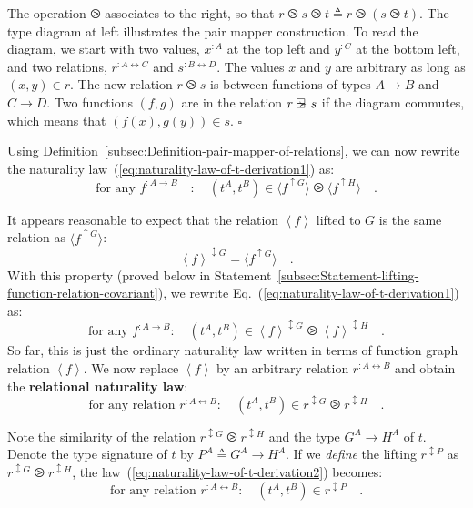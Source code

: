 \noindent The operation $\ogreaterthan$ associates to the right,
so that $r\ogreaterthan s\ogreaterthan t\triangleq r\ogreaterthan\left(s\ogreaterthan t\right)$.
The type diagram at left illustrates the pair mapper construction.
To read the diagram, we start with two values, $x^{:A}$ at the top
left and $y^{:C}$ at the bottom left, and two relations, $r^{:A\leftrightarrow C}$
and $s^{:B\leftrightarrow D}$. The values $x$ and $y$ are arbitrary
as long as $(x,y)\in r$. The new relation $r\ogreaterthan s$ is
between functions of types $A\rightarrow B$ and $C\rightarrow D$.
Two functions $\left(f,g\right)$ are in the relation $r\varogreaterthan s$
if the diagram commutes, which means that $(f(x),g(y))\in s$. $\square$

Using Definition~\ref{subsec:Definition-pair-mapper-of-relations},
we can now rewrite the naturality law~(\ref{eq:naturality-law-of-t-derivation1})
as:
\[
\text{for any }f^{:A\rightarrow B}\quad:\quad(t^{A},t^{B})\in\langle f^{\uparrow G}\rangle\ogreaterthan\langle f^{\uparrow H}\rangle\quad.
\]

It appears reasonable to expect that the relation $\left<f\right>$
lifted to $G$ is the same relation as $\langle f^{\uparrow G}\rangle$:
\[
\left<f\right>^{\updownarrow G}=\langle f^{\uparrow G}\rangle\quad.
\]
With this property (proved below in Statement~\ref{subsec:Statement-lifting-function-relation-covariant}),
we rewrite Eq.~(\ref{eq:naturality-law-of-t-derivation1}) as:
\[
\text{for any }f^{:A\rightarrow B}:\quad(t^{A},t^{B})\in\left<f\right>^{\updownarrow G}\ogreaterthan\left<f\right>^{\updownarrow H}\quad.
\]
So far, this is just the ordinary naturality law written in terms
of function graph relation $\left<f\right>$. We now replace $\left<f\right>$
by an arbitrary relation $r^{:A\leftrightarrow B}$ and obtain the
\textbf{relational naturality law}:
\begin{equation}
\text{for any relation }r^{:A\leftrightarrow B}:\quad(t^{A},t^{B})\in r^{\updownarrow G}\ogreaterthan r^{\updownarrow H}\quad.\label{eq:naturality-law-of-t-derivation2}
\end{equation}

Note the similarity of the relation $r^{\updownarrow G}\ogreaterthan r^{\updownarrow H}$
and the type $G^{A}\rightarrow H^{A}$ of $t$. Denote the type signature
of $t$ by $P^{A}\triangleq G^{A}\rightarrow H^{A}$. If we \emph{define}
the lifting $r^{\updownarrow P}$ as $r^{\updownarrow G}\ogreaterthan r^{\updownarrow H}$,
the law~(\ref{eq:naturality-law-of-t-derivation2}) becomes:
\begin{equation}
\text{for any relation }r^{:A\leftrightarrow B}:\quad(t^{A},t^{B})\in r^{\updownarrow P}\quad.\label{eq:naturality-law-of-t-derivation3}
\end{equation}

